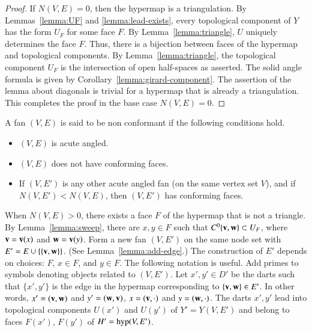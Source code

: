 \begin{proof}
If $N(V,E)=0$, then the hypermap is a triangulation.  By Lemmas~\ref{lemma:UF} and \ref{lemma:lead-exists}, every topological component of $Y$ has
the form $U_F$ for some face $F$.  By Lemma~\ref{lemma:triangle}, $U$ uniquely determines the face $F$.  Thus, there is a bijection between faces of the hypermap and topological components.  By Lemma~\ref{lemma:triangle}, the topological component $U_F$ is the intersection of open half-spaces as asserted.  The solid angle formula is given by Corollary~\ref{lemma:girard-component}.  The assertion of the lemma about diagonals 
is trivial for a hypermap that is already a triangulation. This completes the proof in the base case $N(V,E)=0$.
\end{proof}

\begin{definition}
A fan $(V,E)$ is said to be non conformant if the following conditions hold.
\begin{itemize}
\item $(V,E)$ is acute angled.
\item $(V,E)$ does not have conforming faces.
\item If $(V,E')$ is any other acute angled fan (on the same vertex set $V$), and if
$N(V,E') < N(V,E)$, then $(V,E')$ has conforming faces.
\end{itemize}
\end{definition}

When $N(V,E)>0$,  there exists a face $F$ of the hypermap that is not a triangle.  By Lemma~\ref{lemma:sweep}, there are $x,y\in F$ such that $C^0\{{\mathbf v},{\mathbf w}\}\subset U_F$, where ${\mathbf v} = {\mathbf v}(x)$ and ${\mathbf w} = {\mathbf v}(y)$. Form a new fan $(V,E')$ on the same node set with
$E' = E\cup \{\{{\mathbf v},{\mathbf w}\}\}$.   (See Lemma~\ref{lemma:add-edge}.)  The construction of $E'$ depends on choices: $F$, $x\in F$, and $y\in F$.   The following notation is useful.  Add primes to symbols denoting objects related to $(V,E')$.  
Let $x',y'\in D'$ be the darts such that $\{x',y'\}$ is the edge in the hypermap corresponding to $\{{\mathbf v},{\mathbf w}\}\in E'$.  In other words, $x'=({\mathbf v},{\mathbf w})$ and $y'=({\mathbf w},{\mathbf v})$, $x=({\mathbf v},\cdot)$ and $y=({\mathbf w},\cdot)$. The darts $x',y'$ lead into topological components $U(x')$ and $U(y')$ of $Y'=Y(V,E')$  and belong to faces $F(x')$, $F(y')$ of $H'={\operatorname{hyp}}(V,E')$.



